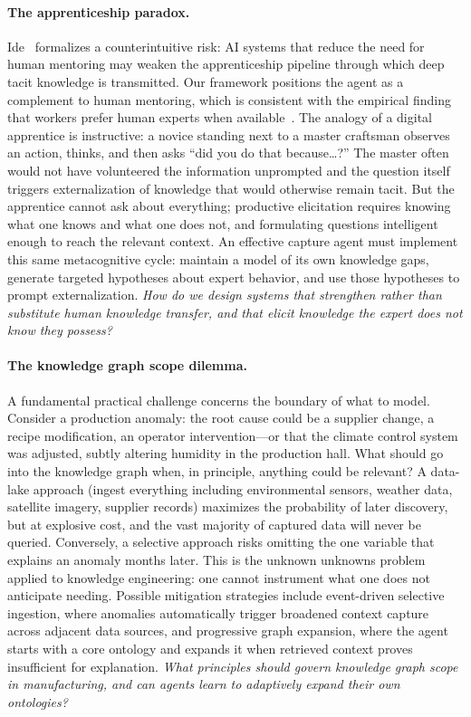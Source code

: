 \documentclass[]{ceurart}
\begin{document}
\paragraph{The apprenticeship paradox.}
Ide~\cite{ide2026} formalizes a counterintuitive risk: AI systems that
reduce the need for human mentoring may weaken the
apprenticeship pipeline through which deep tacit knowledge is
transmitted. Our framework positions the agent as a complement to
human mentoring, which is consistent with the empirical finding that workers
prefer human experts when available~\cite{freire2024}. The analogy
of a digital apprentice is instructive: a novice standing next to
a master craftsman observes an action, thinks, and then asks ``did you
do that because\ldots?'' The master often would not have volunteered the
information unprompted and the question itself triggers externalization
of knowledge that would otherwise remain tacit. But the apprentice
cannot ask about everything; productive elicitation requires
knowing what one knows and what one does not, and formulating
questions intelligent enough to reach the relevant context.
An effective capture agent must implement this same metacognitive
cycle: maintain a model of its own knowledge gaps, generate targeted
hypotheses about expert behavior, and use those hypotheses to prompt
externalization. \emph{How do we design systems that strengthen rather
than substitute human knowledge transfer, and that elicit knowledge
the expert does not know they possess?}

\paragraph{The knowledge graph scope dilemma.}
A fundamental practical challenge concerns the boundary of what to
model. Consider a production anomaly: the root cause could be a supplier
change, a recipe modification, an operator intervention---or that the
climate control system was adjusted, subtly altering humidity in the
production hall. What should go into the knowledge graph when, in
principle, anything could be relevant? A data-lake approach
(ingest everything including environmental sensors, weather data, satellite
imagery, supplier records) maximizes the probability of later
discovery, but at explosive cost, and the vast majority of captured
data will never be queried. Conversely, a selective approach risks
omitting the one variable that explains an anomaly months later.
This is the unknown unknowns problem applied to knowledge
engineering: one cannot instrument what one does not anticipate
needing. Possible mitigation strategies include event-driven selective
ingestion, where anomalies automatically trigger broadened context
capture across adjacent data sources, and progressive graph expansion,
where the agent starts with a core ontology and expands it when
retrieved context proves insufficient for explanation.
\emph{What principles should govern knowledge graph scope in
manufacturing, and can agents learn to adaptively expand their own
ontologies?}
\end{document}
